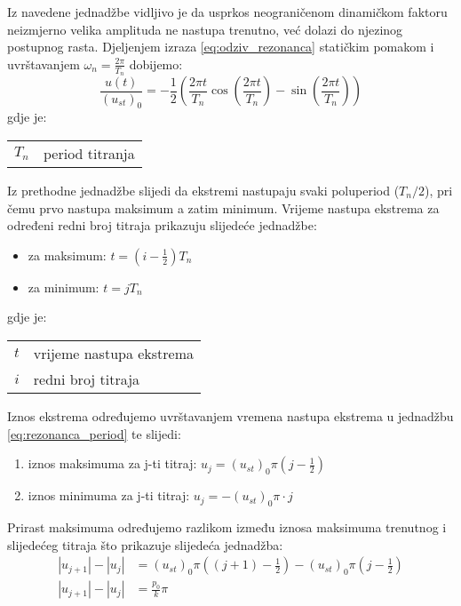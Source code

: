 Iz navedene jednadžbe vidljivo je da usprkos neograničenom dinamičkom faktoru
neizmjerno velika amplituda ne nastupa trenutno, već dolazi do njezinog 
postupnog rasta. Djeljenjem izraza \eqref{eq:odziv_rezonanca} statičkim pomakom i
uvrštavanjem $\omega_n=\frac{2\pi}{T_n}$ dobijemo:
\begin{equation}\label{eq:rezonanca_period}
    \frac{u(t)}{(u_{st})_0}=-\frac{1}{2}
        \left(\frac{2\pi t}{T_n}
                \cos\left(\frac{2\pi t}{T_n}\right)
                -
                \sin\left(\frac{2\pi t}{T_n}\right)
        \right)
\end{equation}
gdje je:
\begin{table}[H]
    \begin{tabular} {r l}
        $T_n$ & period titranja\\
    \end{tabular}
\end{table}

Iz prethodne jednadžbe slijedi da ekstremi nastupaju svaki poluperiod ($T_n/2$), pri
čemu prvo nastupa maksimum a zatim minimum. Vrijeme nastupa ekstrema za određeni
redni broj titraja prikazuju slijedeće jednadžbe:
\begin{itemize}
    \item za maksimum: $t=(i-\frac{1}{2})T_n$
    \item za minimum: $t=jT_n$
\end{itemize}
gdje je:
\begin{table}[H]
    \begin{tabular} {r l}
        $t$ & vrijeme nastupa ekstrema\\
        $i$ & redni broj titraja\\
    \end{tabular}
\end{table}
Iznos ekstrema određujemo uvrštavanjem vremena nastupa ekstrema u jednadžbu
\eqref{eq:rezonanca_period} te slijedi:
\begin{enumerate}
    \item iznos maksimuma za j-ti titraj: $u_j=(u_{st})_0\pi(j-\frac{1}{2})$
    \item iznos minimuma za j-ti titraj: $u_j=-(u_{st})_0\pi\cdot j$ 
\end{enumerate}

Prirast maksimuma određujemo razlikom između iznosa maksimuma trenutnog i slijedećeg
titraja što prikazuje slijedeća jednadžba:
\begin{equation}\label{eq:prirast_maksimuma}
    \begin{split}
        |u_{j+1}|-|u_j| &=(u_{st})_0\pi((j+1)-\frac{1}{2})-(u_{st})_0\pi(j-\frac{1}{2})\\
        |u_{j+1}|-|u_j| &= \frac{p_0}{k}\pi
    \end{split}
\end{equation}

